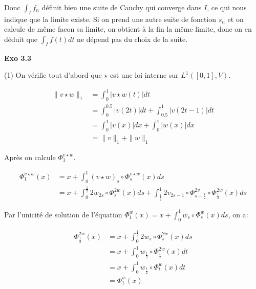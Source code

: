 \documentclass[11pt]{article}
\begin{document}
    Donc $\int_I f_n$ définit bien une suite de Cauchy qui converge dans $I$, ce qui nous indique que la limite existe.
    Si on prend une autre suite de fonction $s_n$ et on calcule de même facon sa limite, on obtient à la fin la même limite,
    donc on en déduit que $\int_I f(t)dt$ ne dépend pas du choix de la suite.

    \textbf{Exo 3.3} 

    (1) On vérifie tout d'abord que $\star$ est une loi interne sur $L^1([0,1],V)$. 

    \vspace{-4em}
    \begin{align*}
      \|v \star w\|_1 &= \int_0^1 |v \star w (t)| dt \\
      &= \int_0^{0.5} |v(2t)| dt + \int_{0.5}^1 |v(2t - 1)| dt \\
      &= \int_0^1 |v(x)| dx + \int_0^1 |w(x)| dx \\
      &= \|v\|_1 + \|w\|_1
    \end{align*}
    \vspace{-4em}

    Après on calcule $\Phi_1^{v \star w}$.

    \vspace{-4em}
    \begin{align*}
      \Phi_1^{v \star w} (x) &= x + \int_0^1 (v \star w)_s \circ \Phi_s^{v \star w} (x) ds \\
      &= x + \int_0^{\frac{1}{2}} 2w_{2s} \circ \Phi_s^{2w} (x) ds + \int_{\frac{1}{2}}^1 2v_{2s-1} \circ  \Phi_{s-\frac{1}{2}}^{2v} \circ \Phi_{\frac{1}{2}}^{2w} (x) ds
    \end{align*}
    \vspace{-4em}

    Par l'unicité de solution de l'équation $\Phi_1^w (x) = x + \int_0^1 w_s \circ \Phi_s^w (x) ds$, on a:

    \vspace{-4em}
    \begin{align*}
      \Phi_{\frac{1}{2}}^{2w} (x) &= x + \int_0^{\frac{1}{2}} 2w_s \circ \Phi_s^{2w}(x)ds \\
      &= x + \int_0^1 w_{\frac{t}{2}} \circ \Phi^{2w}_{\frac{t}{2}} (x) dt \\
      &= x + \int_0^1 w_{\frac{t}{2}} \circ \Phi^{w}_{t} (x) dt \\ 
      &= \Phi_1^w (x) 
    \end{align*}
    \vspace{-4em}
\end{document}
